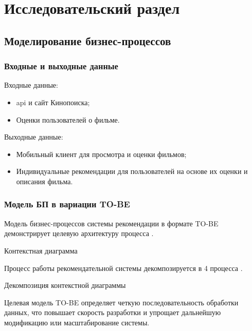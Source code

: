 \chapter{Исследовательский раздел}

\section{Моделирование бизнес-процессов}

\subsection{Входные и выходные данные}
Входные данные:

\begin{itemize}
	\item api и сайт Кинопоиска;
	\item Оценки пользователей о фильме.
\end{itemize}

Выходные данные:

\begin{itemize}
	\item Мобильный клиент для просмотра и оценки фильмов;
	\item Индивидуальные рекомендации для пользователей на основе их оценки и описания фильма.
\end{itemize}

\subsection{Модель БП в вариации TO-BE}

Модель бизнес-процессов системы рекомендации в формате TO-BE демонстрирует целевую архитектуру процесса .
\begin{image}
	\caption{Контекстная диаграмма}
	\label{fig:idef0}
\end{image}

Процесс работы рекомендательной системы декомпозируется в 4 процесса .

\begin{image}
	\caption{Декомпозиция контекстной диаграммы}
	\label{fig:idef0:a0}
\end{image}


Целевая модель TO-BE определяет четкую последовательность обработки данных,
что повышает скорость разработки
и упрощает дальнейшую модификацию или масштабирование системы.

